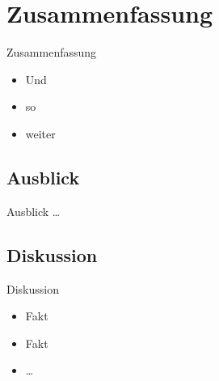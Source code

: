 \section{Zusammenfassung}

\begin{frame}{Zusammenfassung}
    \begin{itemize}
    	\item Und
    	\item so
    	\item weiter
    \end{itemize}
\end{frame}

\subsection{Ausblick}
\begin{frame}{Ausblick}
	\ldots
\end{frame}

\subsection{Diskussion}
\begin{frame}{Diskussion}
	\begin{itemize}
		\item Fakt
		\item Fakt
		\item \ldots
	\end{itemize}
\end{frame}